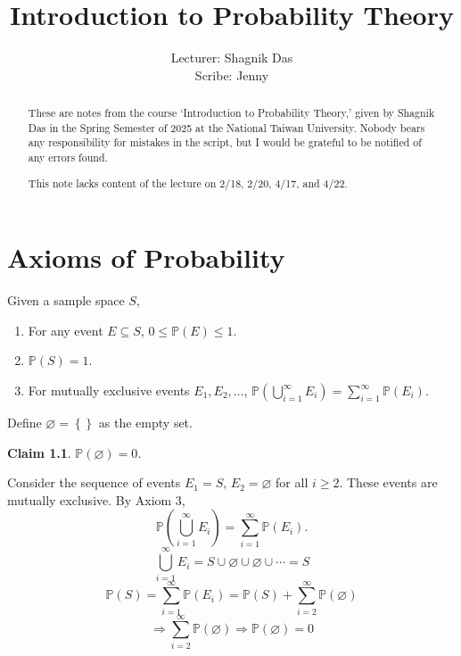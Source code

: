 \documentclass[a4paper,11pt]{amsbook}
\title{Introduction to Probability Theory}
\author[]{Lecturer: Shagnik Das \\ Scribe: Jenny} %
\makeatletter
\renewenvironment{proof}[1][\proofname]{\par
    \pushQED{\qed}%
    \normalfont \topsep6\p@\@plus6\p@\relax
    \trivlist
    \itemindent\z@ %
    \item[\hskip\labelsep
          \scshape
      #1\@addpunct{.}]\ignorespaces
}{%
    \popQED\endtrivlist\@endpefalse
}
\newtheorem{claim}{\hspace{-2em} \color{darkblue} Claim}[chapter]
\theoremstyle{definition}
\theoremstyle{remark}
\renewcommand{\P}{\mathbb{P}}
\newcommand\inc\subseteq
\newcommand\0{\varnothing}
\makeatother
\begin{document}
\begin{abstract}
These are notes from the course `Introduction to Probability Theory,' given by Shagnik Das in the Spring Semester of 2025 at the National Taiwan University. Nobody bears any responsibility for mistakes in the script, but I would be grateful to be notified of any errors found.

This note lacks content of the lecture on 2/18, 2/20, 4/17, and 4/22.
\end{abstract}

\clearpage\maketitle

\tableofcontents
\clearpage
{}

\chapter{Axioms of Probability}

    Given a sample space $S$, 
    \begin{enumerate}[label=(\arabic*)]
        \item For any event $E\inc S$, $0\leq\P(E)\leq1$.
        \item $\P(S)=1$.
        \item For mutually exclusive events $E_1,E_2,\ldots$, $\P\left(\bigcup_{i=1}^\infty E_i\right)=\sum_{i=1}^\infty\P(E_i)$. 
    \end{enumerate}
    
    Define $\varnothing=\left\{\right\}$ as the empty set.\\

    \begin{claim}
        $\P(\varnothing)=0$.
    \end{claim}
    \begin{proof}
        Consider the sequence of events $E_1=S$, $E_2=\varnothing$ for all $i\geq2$.
        These events are mutually exclusive.
        By Axiom 3, $$\P\left(\bigcup_{i=1}^\infty E_i\right)=\sum_{i=1}^\infty\P(E_i).$$
        $$\bigcup_{i=1}^\infty E_i=S\cup\varnothing\cup\varnothing\cup\cdots=S$$ 
        $$\P(S)=\sum_{i=1}^\infty\P(E_i)=\P(S)+\sum_{i=2}^\infty\P(\varnothing)$$
        $$\Rightarrow\sum_{i=2}^\infty\P(\varnothing)\Rightarrow\P(\varnothing)=0$$
    \end{proof}
\end{document}
